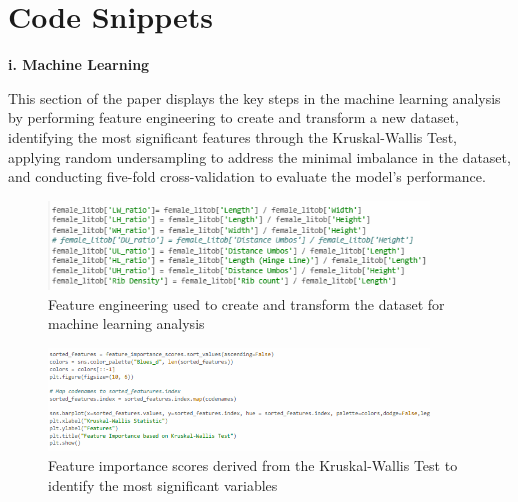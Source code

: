 %
%
%                 

\chapter{Code Snippets}
\label{sec:appendixa}



%

\noindent\textbf{i. Machine Learning}
\vspace{-0.5cm}

This section of the paper displays the key steps in the machine learning analysis by performing feature engineering to create and transform a new dataset, identifying the most significant features through the Kruskal-Wallis Test, applying random undersampling to address the minimal imbalance in the dataset, and conducting five-fold cross-validation to evaluate the model's performance.


\begin{figure}[!htbp]
	\centering
	\includegraphics[width=0.9\textwidth, angle=0]{figures/feature_engineering.png}
	\caption{Feature engineering used to create and transform the dataset for machine learning analysis}
\end{figure}

\begin{figure}[!htbp]
	\centering
	\includegraphics[width=0.9\textwidth, angle=0]{figures/feature_importance.png}
	\caption{Feature importance scores derived from the Kruskal-Wallis Test to identify the most significant variables}
\end{figure}

